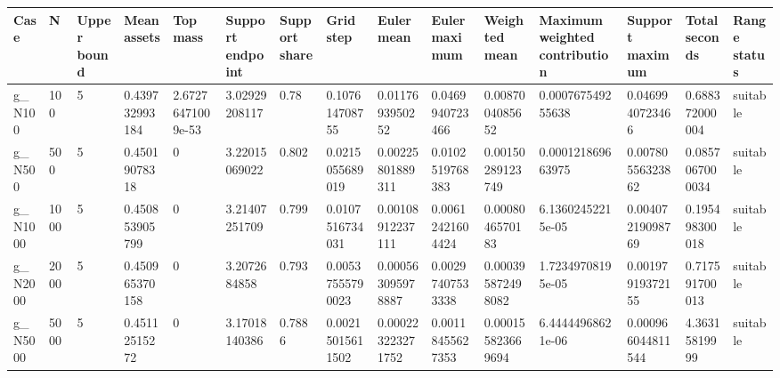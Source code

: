 \begin{tabular}{lllllllllllllll}
\hline
Case & N & Upper bound & Mean assets & Top mass & Support endpoint & Support share & Grid step & Euler mean & Euler maximum & Weighted mean & Maximum weighted contribution & Support maximum & Total seconds & Range status \\
\hline
g\_N100 & 100 & 5 & 0.439732993184 & 2.67276471009e-53 & 3.02929208117 & 0.78 & 0.107614708755 & 0.0117693950252 & 0.0469940723466 & 0.0087004085652 & 0.000767549255638 & 0.0469940723466 & 0.688372000004 & suitable \\
g\_N500 & 500 & 5 & 0.45019078318 & 0 & 3.22015069022 & 0.802 & 0.0215055689019 & 0.00225801889311 & 0.0102519768383 & 0.00150289123749 & 0.000121869663975 & 0.00780556323862 & 0.0857067000034 & suitable \\
g\_N1000 & 1000 & 5 & 0.450853905799 & 0 & 3.21407251709 & 0.799 & 0.0107516734031 & 0.00108912237111 & 0.00612421604424 & 0.0008046570183 & 6.13602452215e-05 & 0.00407219098769 & 0.195498300018 & suitable \\
g\_N2000 & 2000 & 5 & 0.450965370158 & 0 & 3.2072684858 & 0.793 & 0.00537555790023 & 0.000563095978887 & 0.00297407533338 & 0.000395872498082 & 1.72349708195e-05 & 0.00197919372155 & 0.717591700013 & suitable \\
g\_N5000 & 5000 & 5 & 0.45112515272 & 0 & 3.17018140386 & 0.7886 & 0.00215015611502 & 0.000223223271752 & 0.00118455627353 & 0.000155823669694 & 6.44444968621e-06 & 0.000966044811544 & 4.36315819999 & suitable \\
\hline
\end{tabular}
